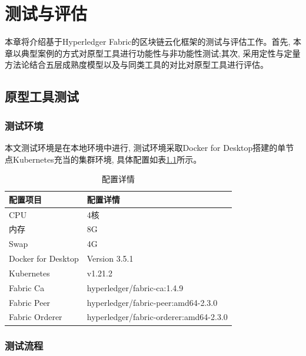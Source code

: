 \chapter{测试与评估}

本章将介绍基于Hyperledger Fabric的区块链云化框架的测试与评估工作。首先, 本章以典型案例的方式对原型工具进行功能性与非功能性测试;其次, 采用定性与定量方法论\cite{tashakkori1998mixed}结合五层成熟度模型以及与同类工具的对比对原型工具进行评估。

\section{原型工具测试}

\subsection{测试环境}

本文测试环境是在本地环境中进行, 测试环境采取Docker for Desktop搭建的单节点Kubernetes充当的集群环境, 具体配置如表\ref{computer}所示。

{\footnotesize
\begin{longtable}[h]{m{100pt} m{160pt}}
    \caption[配置详情]{配置详情} \label{computer} \\
        \toprule   
        \textbf{配置项目}&\textbf{配置详情}\\
        \hline
        CPU&4核\\
  
        内存&8G\\
    
        Swap&4G\\
        
        Docker for Desktop&Version 3.5.1\\
        
        Kubernetes&v1.21.2\\

        Fabric Ca&hyperledger/fabric-ca:1.4.9\\

        Fabric Peer&hyperledger/fabric-peer:amd64-2.3.0\\

        Fabric Orderer&hyperledger/fabric-orderer:amd64-2.3.0\\
        \bottomrule 
    \end{longtable} 
}

\subsection{测试流程}

